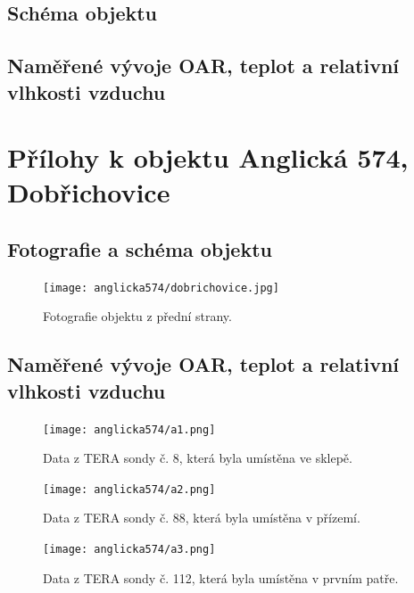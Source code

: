 \section{Schéma objektu}

\section{Naměřené vývoje OAR, teplot a relativní vlhkosti vzduchu}


\chapter{Přílohy k objektu Anglická 574, Dobřichovice}\label{navesti:priloha_anglicka574}

\section{Fotografie a schéma objektu}
\begin{figure}[ht]
    \centering
    \texttt{[image: anglicka574/dobrichovice.jpg]}
    \caption{Fotografie objektu z přední strany.}
    \label{fig:anglicka574_fotografie}
\end{figure}
\section{Naměřené vývoje OAR, teplot a relativní vlhkosti vzduchu}
\begin{figure}[ht]
    \centering
    \texttt{[image: anglicka574/a1.png]}
    \caption{Data z TERA sondy č. 8, která byla umístěna ve sklepě.}
    \label{fig:anglicka574_a1}
\end{figure}
\begin{figure}[ht]
    \centering
    \texttt{[image: anglicka574/a2.png]}
    \caption{Data z TERA sondy č. 88, která byla umístěna v přízemí.}
    \label{fig:anglicka574_a2}
\end{figure}
\begin{figure}[ht]
    \centering
    \texttt{[image: anglicka574/a3.png]}
    \caption{Data z TERA sondy č. 112, která byla umístěna v prvním patře.}
    \label{fig:anglicka574_a3}
\end{figure}


